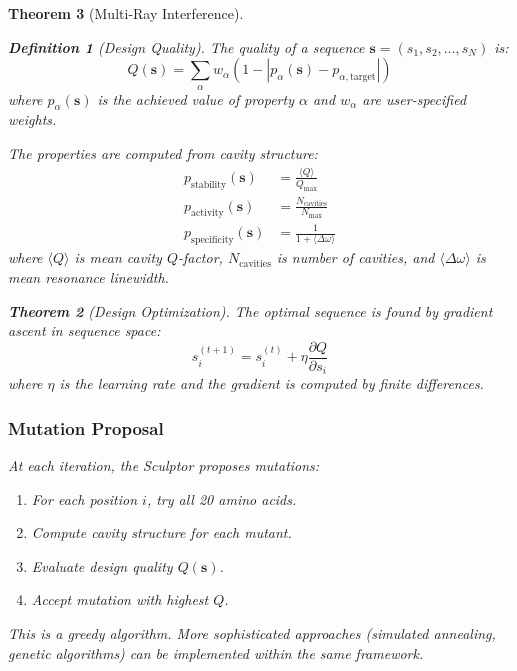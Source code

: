 \documentclass[11pt,a4paper]{article}
\newtheorem{theorem}{Theorem}[section]
\newtheorem{definition}[theorem]{Definition}
\begin{document}
\begin{theorem}[Multi-Ray Interference]
\begin{definition}[Design Quality]
The quality of a sequence $\mathbf{s} = (s_1, s_2, \ldots, s_N)$ is:
\begin{equation}
Q(\mathbf{s}) = \sum_{\alpha} w_\alpha \left(1 - |p_\alpha(\mathbf{s}) - p_{\alpha,\text{target}}|\right)
\end{equation}
where $p_\alpha(\mathbf{s})$ is the achieved value of property $\alpha$ and $w_\alpha$ are user-specified weights.
\end{definition}

The properties are computed from cavity structure:
\begin{align}
p_{\text{stability}}(\mathbf{s}) &= \frac{\langle Q \rangle}{Q_{\text{max}}} \\
p_{\text{activity}}(\mathbf{s}) &= \frac{N_{\text{cavities}}}{N_{\text{max}}} \\
p_{\text{specificity}}(\mathbf{s}) &= \frac{1}{1 + \langle \Delta \omega \rangle}
\end{align}
where $\langle Q \rangle$ is mean cavity $Q$-factor, $N_{\text{cavities}}$ is number of cavities, and $\langle \Delta \omega \rangle$ is mean resonance linewidth.

\begin{theorem}[Design Optimization]
The optimal sequence is found by gradient ascent in sequence space:
\begin{equation}
s_i^{(t+1)} = s_i^{(t)} + \eta \frac{\partial Q}{\partial s_i}
\end{equation}
where $\eta$ is the learning rate and the gradient is computed by finite differences.
\end{theorem}

\subsubsection{Mutation Proposal}

At each iteration, the Sculptor proposes mutations:
\begin{enumerate}
\item For each position $i$, try all 20 amino acids.
\item Compute cavity structure for each mutant.
\item Evaluate design quality $Q(\mathbf{s})$.
\item Accept mutation with highest $Q$.
\end{enumerate}

This is a greedy algorithm. More sophisticated approaches (simulated annealing, genetic algorithms) can be implemented within the same framework.


\end{theorem}
\end{document}
